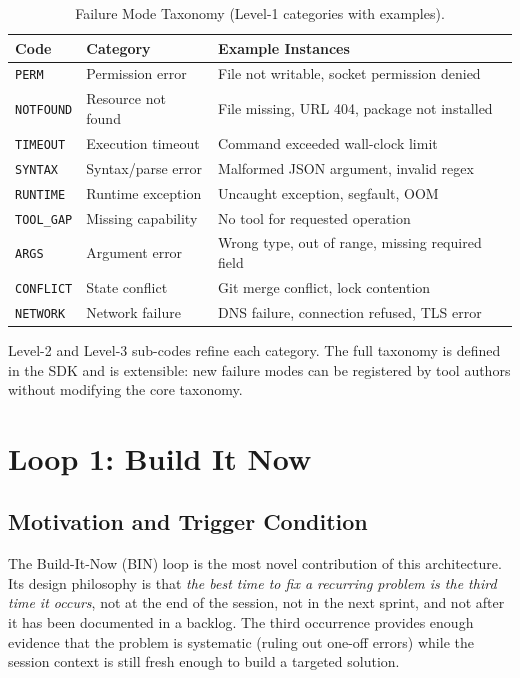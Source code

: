 \documentclass[11pt]{article}
\begin{document}
\begin{table}[H]
\centering
\caption{Failure Mode Taxonomy (Level-1 categories with examples).}
\label{tab:failure_modes}
\begin{tabular}{llp{6cm}}
\toprule
Code & Category & Example Instances \\
\midrule
\texttt{PERM} & Permission error & File not writable, socket permission denied \\
\texttt{NOTFOUND} & Resource not found & File missing, URL 404, package not installed \\
\texttt{TIMEOUT} & Execution timeout & Command exceeded wall-clock limit \\
\texttt{SYNTAX} & Syntax/parse error & Malformed JSON argument, invalid regex \\
\texttt{RUNTIME} & Runtime exception & Uncaught exception, segfault, OOM \\
\texttt{TOOL\_GAP} & Missing capability & No tool for requested operation \\
\texttt{ARGS} & Argument error & Wrong type, out of range, missing required field \\
\texttt{CONFLICT} & State conflict & Git merge conflict, lock contention \\
\texttt{NETWORK} & Network failure & DNS failure, connection refused, TLS error \\
\bottomrule
\end{tabular}
\end{table}

Level-2 and Level-3 sub-codes refine each category. The full taxonomy is
defined in the SDK and is extensible: new failure modes can be registered by
tool authors without modifying the core taxonomy.

\section{Loop 1: Build It Now}
\label{sec:loop1}

\subsection{Motivation and Trigger Condition}

The Build-It-Now (BIN) loop is the most novel contribution of this architecture.
Its design philosophy is that \emph{the best time to fix a recurring problem
is the third time it occurs}, not at the end of the session, not in the next
sprint, and not after it has been documented in a backlog. The third occurrence
provides enough evidence that the problem is systematic (ruling out one-off
errors) while the session context is still fresh enough to build a targeted
solution.
\end{document}
